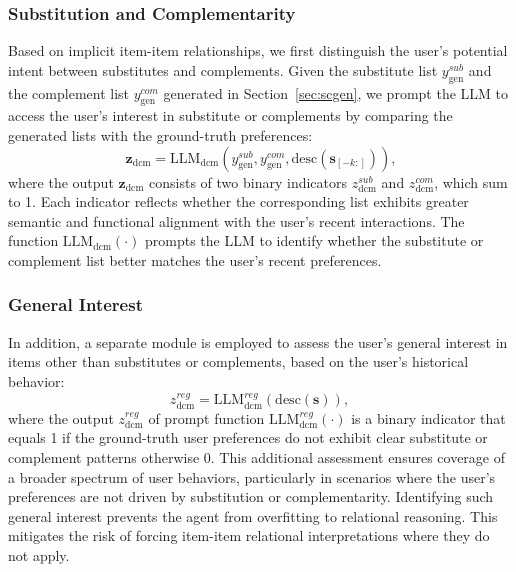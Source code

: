 \subsubsection{Substitution and Complementarity}
Based on implicit item-item relationships, we first distinguish the user's potential intent between substitutes and complements. Given the substitute list $y_{\text{gen}}^{sub}$ and the complement list $y_{\text{gen}}^{com}$ generated in Section~\ref{sec:scgen}, we prompt the LLM to access the user's interest in substitute or complements by comparing the generated lists with the ground-truth preferences:
\begin{equation}~\label{eq_agentdr:scdcm}
     \mathbf{z}_{\text{dcm}} = \text{LLM}_\text{dcm}(y_{\text{gen}}^{sub}, y_{\text{gen}}^{com}, \text{desc}(\mathbf{s}_{[-k:]})),
\end{equation}
where the output $\mathbf{z}_{\text{dcm}}$ consists of two binary indicators $z_{\text{dcm}}^{sub}$ and $z_{\text{dcm}}^{com}$, which sum to 1. Each indicator reflects whether the corresponding list exhibits greater semantic and functional alignment with the user's recent interactions. The function $\text{LLM}_\text{dcm}(\cdot)$ prompts the LLM to identify whether the substitute or complement list better matches the user’s recent preferences.

\subsubsection{General Interest}
In addition, a separate module is employed to assess the user's general interest in items other than substitutes or complements, based on the user’s historical behavior:
\begin{equation}\label{eq_agentdr:reglearn}
     z_{\text{dcm}}^{reg} = \text{LLM}_\text{dcm}^{reg}(\text{desc}(\mathbf{s})),
\end{equation}
where the output $z_{\text{dcm}}^{reg}$ of prompt function $\text{LLM}_\text{dcm}^{reg}(\cdot)$ is a binary indicator that equals 1 if the ground-truth user preferences do not exhibit clear substitute or complement patterns otherwise 0. This additional assessment ensures coverage of a broader spectrum of user behaviors, particularly in scenarios where the user’s preferences are not driven by substitution or complementarity. Identifying such general interest prevents the agent from overfitting to relational reasoning. This mitigates the risk of forcing item-item relational interpretations where they do not apply.

